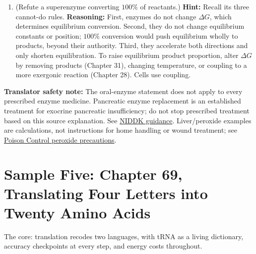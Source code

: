 \begin{enumerate}[itemsep=3pt]
\item (Refute a superenzyme converting $100\%$ of reactants.) \textbf{Hint:} Recall its three cannot-do rules. \textbf{Reasoning:} First, enzymes do not change $\Delta G$, which determines equilibrium conversion. Second, they do not change equilibrium constants or position; $100\%$ conversion would push equilibrium wholly to products, beyond their authority. Third, they accelerate both directions and only shorten equilibration. To raise equilibrium product proportion, alter $\Delta G$ by removing products (Chapter 31), changing temperature, or coupling to a more exergonic reaction (Chapter 28). Cells use coupling.
\end{enumerate}

\textbf{Translator safety note:} The oral-enzyme statement does not apply to every prescribed enzyme medicine. Pancreatic enzyme replacement is an established treatment for exocrine pancreatic insufficiency; do not stop prescribed treatment based on this source explanation. See \href{https://www.niddk.nih.gov/health-information/digestive-diseases/exocrine-pancreatic-insufficiency}{NIDDK guidance}. Liver/peroxide examples are calculations, not instructions for home handling or wound treatment; see \href{https://www.poison.org/articles/hydrogen-peroxide}{Poison Control peroxide precautions}.

\section{Sample Five: Chapter 69, Translating Four Letters into Twenty Amino Acids}

The core: translation recodes two languages, with tRNA as a living dictionary, accuracy checkpoints at every step, and energy costs throughout.

